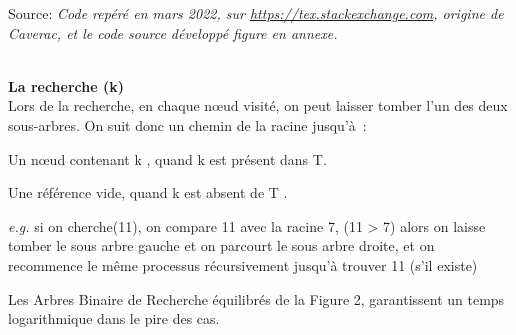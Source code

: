 \documentclass[hidelinks,a4paper,12pt]{article}
\begin{document}
\begin{center}
\caption*{Source: \textit{Code repéré en mars 2022, sur \href{https://tex.stackexchange.com/questions/422128/how-to-make-binary-search-trees-in-an-easy-and-straight-forward-way}{https://tex.stackexchange.com}, origine de Caverac, et le code source développé figure en annexe.} } 
\end{center}

~\\

\textbf{La recherche (k)} \medskip \\
Lors de la recherche, en chaque nœud visité, on peut laisser tomber l’un des deux sous-arbres. On suit donc un chemin de la racine jusqu'à :

\begin{description}[font=$\bullet$~\normalfont\scshape\color{red!50!black}]
	\item Un nœud contenant k , quand k est présent dans T.
	\item Une référence vide, quand k est absent de T \cite{NoteCours}.
\end{description} 	
\textit{e.g.} si on cherche(11), on compare 11 avec la racine 7, (11 > 7) alors on laisse tomber le sous arbre gauche et on parcourt le sous arbre droite, et on recommence le même processus récursivement jusqu'à trouver 11 (s'il existe)

Les Arbres Binaire de Recherche équilibrés de la Figure 2, garantissent un temps logarithmique dans le pire des cas. 

~\\
\end{document}
